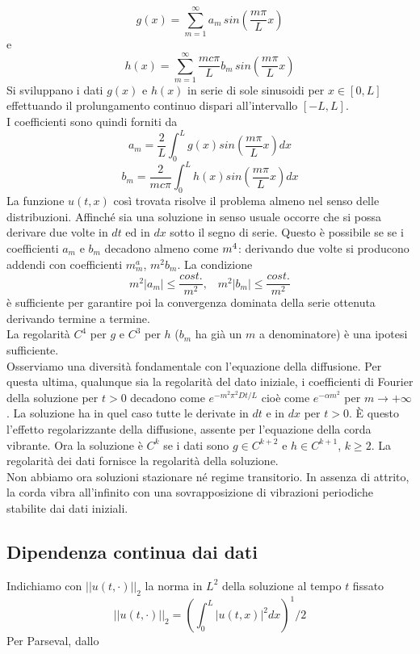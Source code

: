 \[
	g(x)= \sum_{m=1}^{\infty} a_m \, sin \left( \frac{m\pi}{L} x \right)
\]
e
\[
	h(x)= \sum_{m=1}^{\infty} \frac{mc\pi}{L} b_m \, sin \left(
	\frac{m\pi}{L} x \right)
\]
Si sviluppano i dati $g(x)$ e $h(x)$ in serie di sole sinusoidi per $x \in
[0,L]$ effettuando il prolungamento continuo dispari all'intervallo $[-L,L]$.\\
I coefficienti sono quindi forniti da
\[
	a_m= \frac{2}{L} \int_0^L g(x) sin \left( \frac{m\pi}{L} x \right) dx
\]
\[
	b_m= \frac{2}{mc \pi} \int_0^L h(x) sin \left( \frac{m\pi}{L} x \right)
dx
\]
La funzione $u(t,x)$ cos\`i trovata risolve il problema almeno nel senso delle
distribuzioni.
Affinch\'e sia una soluzione in senso usuale occorre che si possa derivare due
volte in $dt$ ed in $dx$ sotto il segno di serie.
Questo \`e possibile se se i coefficienti $a_m$ e $b_m$ decadono almeno come
$\/m^4$: derivando due volte si producono addendi con coefficienti $m^a_m$,
$m^2b_m$. La condizione
\[
	m^2|a_m|\leq \frac{cost.}{m^2}, \;\;\; m^2|b_m|\leq \frac{cost.}{m^2}
\]
\`e sufficiente per garantire poi la convergenza dominata della serie ottenuta
derivando termine a termine.\\
La regolarit\`a $C^4$ per $g$ e $C^3$ per $h$ ($b_m$ ha gi\`a un $m$ a
denominatore) \`e una ipotesi sufficiente.\\
Osserviamo una diversit\`a fondamentale con l'equazione della diffusione. Per
questa ultima, qualunque sia la regolarit\`a del dato iniziale, i coefficienti
di Fourier della soluzione per $t>0$ decadono come $e^{-m^2 \pi^2 Dt/L}$ cio\`e
come $e^{-\alpha m^2}$ per $m \to +\infty$.
La soluzione ha in quel caso tutte le derivate in $dt$ e in $dx$ per $t>0$.
\`E questo l'effetto regolarizzante della diffusione, assente per l'equazione
della corda vibrante. Ora la soluzione \`e $C^k$ se i dati sono $g \in C^{k+2}$
e $h \in C^{k+1}$, $k\geq 2$. La regolarit\`a dei dati fornisce la regolarit\`a
della soluzione.\\
Non abbiamo ora soluzioni stazionare n\'e regime transitorio. In assenza di
attrito, la corda vibra all'infinito con una sovrapposizione di vibrazioni
periodiche stabilite dai dati iniziali.
\subsection{Dipendenza continua dai dati}
Indichiamo con $||u(t, \cdot)||_2$ la norma in $L^2$ della soluzione al tempo
$t$ fissato
\[
	||u(t, \cdot)||_2=
	\left(
	\int_0^L |u(t,x)|^2 dx
	\right)^1/2
\]
Per Parseval, dallo
